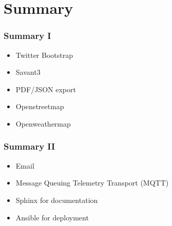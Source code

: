 \section{Summary}
%
\begin{frame}
\frametitle{Summary I}
%
\begin{itemize}
  \item Twitter Bootstrap 
  \item Savant3
\end{itemize}
\begin{itemize}
  \item PDF/JSON export
  \item Openstreetmap
  \item Openweathermap
\end{itemize}
\end{frame}
%
\begin{frame}
\frametitle{Summary II}
%
\begin{itemize}
  \item Email
  \item Message Queuing Telemetry Transport (MQTT)
\end{itemize}
\begin{itemize}
  \item Sphinx for documentation
  \item Ansible for deployment
\end{itemize}
\end{frame}
